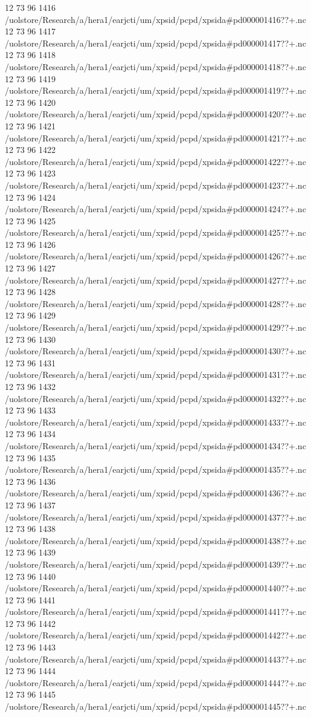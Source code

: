 12 73 96
1416
/uolstore/Research/a/hera1/earjcti/um/xpsid/pcpd/xpsida#pd000001416??+.nc
12 73 96
1417
/uolstore/Research/a/hera1/earjcti/um/xpsid/pcpd/xpsida#pd000001417??+.nc
12 73 96
1418
/uolstore/Research/a/hera1/earjcti/um/xpsid/pcpd/xpsida#pd000001418??+.nc
12 73 96
1419
/uolstore/Research/a/hera1/earjcti/um/xpsid/pcpd/xpsida#pd000001419??+.nc
12 73 96
1420
/uolstore/Research/a/hera1/earjcti/um/xpsid/pcpd/xpsida#pd000001420??+.nc
12 73 96
1421
/uolstore/Research/a/hera1/earjcti/um/xpsid/pcpd/xpsida#pd000001421??+.nc
12 73 96
1422
/uolstore/Research/a/hera1/earjcti/um/xpsid/pcpd/xpsida#pd000001422??+.nc
12 73 96
1423
/uolstore/Research/a/hera1/earjcti/um/xpsid/pcpd/xpsida#pd000001423??+.nc
12 73 96
1424
/uolstore/Research/a/hera1/earjcti/um/xpsid/pcpd/xpsida#pd000001424??+.nc
12 73 96
1425
/uolstore/Research/a/hera1/earjcti/um/xpsid/pcpd/xpsida#pd000001425??+.nc
12 73 96
1426
/uolstore/Research/a/hera1/earjcti/um/xpsid/pcpd/xpsida#pd000001426??+.nc
12 73 96
1427
/uolstore/Research/a/hera1/earjcti/um/xpsid/pcpd/xpsida#pd000001427??+.nc
12 73 96
1428
/uolstore/Research/a/hera1/earjcti/um/xpsid/pcpd/xpsida#pd000001428??+.nc
12 73 96
1429
/uolstore/Research/a/hera1/earjcti/um/xpsid/pcpd/xpsida#pd000001429??+.nc
12 73 96
1430
/uolstore/Research/a/hera1/earjcti/um/xpsid/pcpd/xpsida#pd000001430??+.nc
12 73 96
1431
/uolstore/Research/a/hera1/earjcti/um/xpsid/pcpd/xpsida#pd000001431??+.nc
12 73 96
1432
/uolstore/Research/a/hera1/earjcti/um/xpsid/pcpd/xpsida#pd000001432??+.nc
12 73 96
1433
/uolstore/Research/a/hera1/earjcti/um/xpsid/pcpd/xpsida#pd000001433??+.nc
12 73 96
1434
/uolstore/Research/a/hera1/earjcti/um/xpsid/pcpd/xpsida#pd000001434??+.nc
12 73 96
1435
/uolstore/Research/a/hera1/earjcti/um/xpsid/pcpd/xpsida#pd000001435??+.nc
12 73 96
1436
/uolstore/Research/a/hera1/earjcti/um/xpsid/pcpd/xpsida#pd000001436??+.nc
12 73 96
1437
/uolstore/Research/a/hera1/earjcti/um/xpsid/pcpd/xpsida#pd000001437??+.nc
12 73 96
1438
/uolstore/Research/a/hera1/earjcti/um/xpsid/pcpd/xpsida#pd000001438??+.nc
12 73 96
1439
/uolstore/Research/a/hera1/earjcti/um/xpsid/pcpd/xpsida#pd000001439??+.nc
12 73 96
1440
/uolstore/Research/a/hera1/earjcti/um/xpsid/pcpd/xpsida#pd000001440??+.nc
12 73 96
1441
/uolstore/Research/a/hera1/earjcti/um/xpsid/pcpd/xpsida#pd000001441??+.nc
12 73 96
1442
/uolstore/Research/a/hera1/earjcti/um/xpsid/pcpd/xpsida#pd000001442??+.nc
12 73 96
1443
/uolstore/Research/a/hera1/earjcti/um/xpsid/pcpd/xpsida#pd000001443??+.nc
12 73 96
1444
/uolstore/Research/a/hera1/earjcti/um/xpsid/pcpd/xpsida#pd000001444??+.nc
12 73 96
1445
/uolstore/Research/a/hera1/earjcti/um/xpsid/pcpd/xpsida#pd000001445??+.nc
